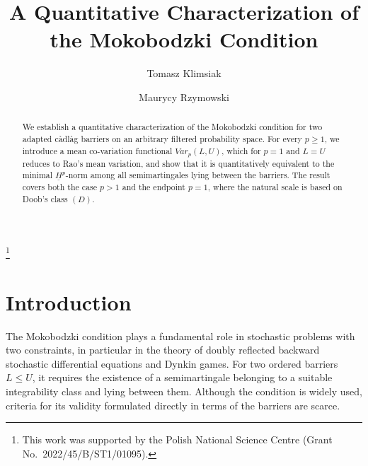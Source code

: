 \documentclass[11pt,a4paper,reqno]{amsart}
\theoremstyle{definition}
\numberwithin{equation}{section}
\begin{document}
\title[A Quantitative Characterization of the Mokobodzki Condition]{A Quantitative Characterization of the Mokobodzki Condition}

\author[T. Klimsiak]{Tomasz Klimsiak}
\author[M. Rzymowski]{Maurycy Rzymowski}

\thanks{This work was supported by the Polish National Science Centre
(Grant No.~2022/45/B/ST1/01095).}


\address{
Faculty of Mathematics and Computer Science,
Nicolaus Copernicus University in Toru\'n,
Chopina 12/18,
87-100 Toru\'n,
Poland
}





\begin{abstract}
We establish a quantitative characterization of the Mokobodzki condition for two 
adapted c\`adl\`ag barriers on an arbitrary filtered probability space. 
For every $p\geq1$, we introduce a mean co-variation functional $Var_p(L,U)$, 
which for $p=1$ and $L=U$ reduces to Rao's mean variation, 
and show that it is quantitatively equivalent to the minimal $\underline H^p$-norm among 
all semimartingales lying between the barriers. The result covers both the case $p>1$ 
and the endpoint $p=1$, where the natural scale is based on Doob's class $(D)$.

\end{abstract}

\maketitle

\section{Introduction}

The Mokobodzki condition plays a fundamental role in stochastic problems
with two constraints, in particular in the theory of doubly reflected
backward stochastic differential equations and Dynkin games. For two ordered
barriers $L\leq U$, it requires the existence of a semimartingale belonging
to a suitable integrability class and lying between them. Although the
condition is widely used, criteria for its validity formulated directly in
terms of the barriers are scarce.
\end{document}
